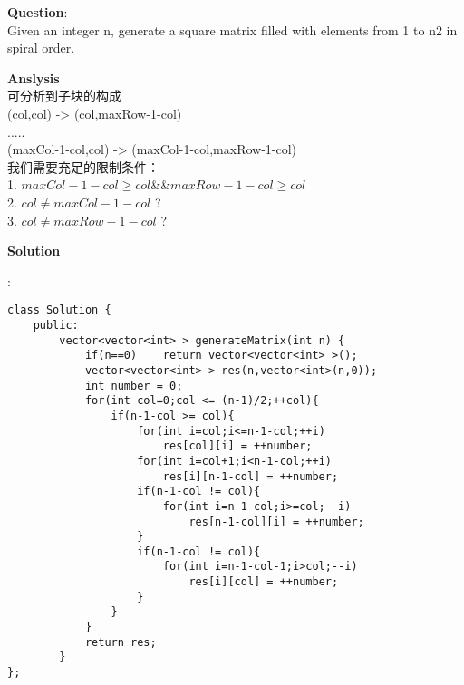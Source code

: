 \begin{description}
    \item{\textbf{Question}}:\\%
		Given an integer n, generate a square matrix filled with elements from 1 to n2 in spiral order.\\

    \item{\textbf{Anslysis}}\\
		可分析到子块的构成\\
		(col,col) -> (col,maxRow-1-col) \\
		.....\\
		(maxCol-1-col,col) -> (maxCol-1-col,maxRow-1-col)\\
		我们需要充足的限制条件：\\
		1.	$maxCol-1-col \ge col \&\& maxRow-1-col \ge col$\\
		2.	$col \ne maxCol-1-col$ ?\\
		3.	$col \ne maxRow-1-col$ ?\\

    \item{\textbf{Solution}}\\
	\item{} : \\
		\begin{lstlisting}
class Solution {
	public:
		vector<vector<int> > generateMatrix(int n) {
			if(n==0)	return vector<vector<int> >();
			vector<vector<int> > res(n,vector<int>(n,0));
			int number = 0;
			for(int col=0;col <= (n-1)/2;++col){
				if(n-1-col >= col){
					for(int i=col;i<=n-1-col;++i)
						res[col][i] = ++number; 
					for(int i=col+1;i<n-1-col;++i)
						res[i][n-1-col] = ++number;
					if(n-1-col != col){
						for(int i=n-1-col;i>=col;--i)
							res[n-1-col][i] = ++number;
					}
					if(n-1-col != col){
						for(int i=n-1-col-1;i>col;--i)
							res[i][col] = ++number;
					}
				}
			}
			return res;
		}
};
		\end{lstlisting}

\end{description}

